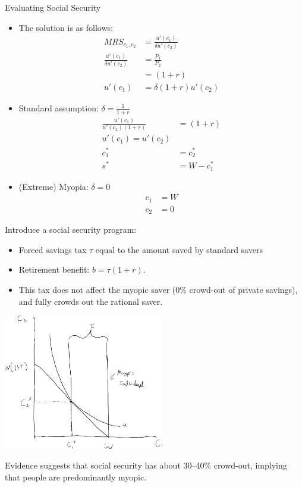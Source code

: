 \documentclass[10pt]{extarticle}
\begin{document}
\begin{problem}{Evaluating Social Security}
\begin{center}
    \end{center}
    \begin{itemize}
      \item The solution is as follows:
        \begin{align*}
          MRS_{c_1,c_2} &= \frac{u'(c_1)}{\delta u'(c_2)}\\
                       \frac{u'(c_1)}{\delta u'(c_2)} &= \frac{P_1}{P_2}\\
                                                      &= (1+r)\\
                       u'(c_1) &= \delta (1+r) u'(c_2)
        \end{align*}
      \item Standard assumption: $\delta = \frac{1}{1+r}$
        \begin{align*}
          \frac{u'(c_1)}{u'(c_2)(1+r)} &= (1+r)\\
          u'(c_1) = u'(c_2)\\
          c_1^* &= c_2^*\\
          s^* &= W - c_1^*
        \end{align*}
      \item (Extreme) Myopia: $\delta = 0$
        \begin{align*}
          c_1 &= W\\
          c_2 &= 0
        \end{align*}
    \end{itemize}
    Introduce a social security program:
    \begin{itemize}
      \item Forced savings tax $\tau$ equal to the amount saved by standard savers
      \item Retirement benefit: $b = \tau(1+r)$.
      \item This tax does not affect the myopic saver (0\% crowd-out of private savings), and fully crowds out the rational saver.
    \end{itemize}
    \begin{center}
      \includegraphics[width=7cm]{images/retirement_myopia.png}
    \end{center}
    Evidence suggests that social security has about 30--40\% crowd-out, implying that people are predominantly myopic.\newline


\end{problem}
\end{document}
